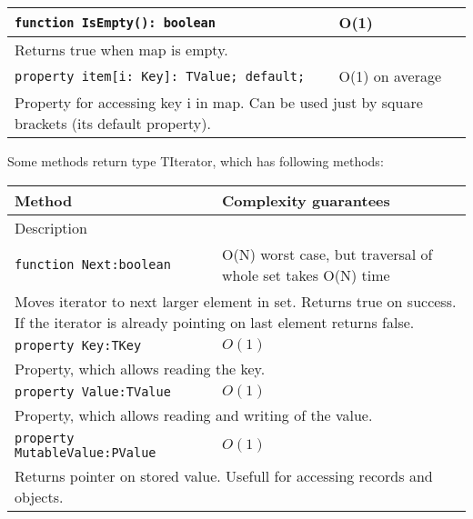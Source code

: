 \begin{longtable}{|m{10cm}|m{5cm}|}
\verb!function IsEmpty(): boolean! & O(1) \\ \hline
\multicolumn{2}{|m{15cm}|}{Returns true when map is empty.} \\\hline

\verb!property item[i: Key]: TValue; default;! & O(1) on average \\\hline
\multicolumn{2}{|m{15cm}|}{Property for accessing key i in map. Can be used just by square
brackets (its default property).} \\\hline\hline


\end{longtable}

Some methods return type TIterator, which has following methods:
\begin{longtable}{|m{10cm}|m{5cm}|}                                                             
\hline
Method & Complexity guarantees \\ \hline                                                  
\multicolumn{2}{|m{15cm}|}{Description} \\ \hline\hline                                               
\verb!function Next:boolean! & O(N) worst case, but traversal of whole set takes O(N) time \\\hline
\multicolumn{2}{|m{15cm}|}{Moves iterator to next larger element in set. Returns true on
success. If the iterator is already pointing on last element returns false.} \\\hline\hline

\verb!property Key:TKey! & $O(1)$ \\\hline
\multicolumn{2}{|m{15cm}|}{Property, which allows reading the key.} \\\hline

\verb!property Value:TValue! & $O(1)$ \\\hline
\multicolumn{2}{|m{15cm}|}{Property, which allows reading and writing of the value.} \\\hline
\verb!property MutableValue:PValue! & $O(1)$ \\\hline
\multicolumn{2}{|m{15cm}|}{Returns pointer on stored value. Usefull for accessing records and
objects.} \\\hline


\end{longtable}
